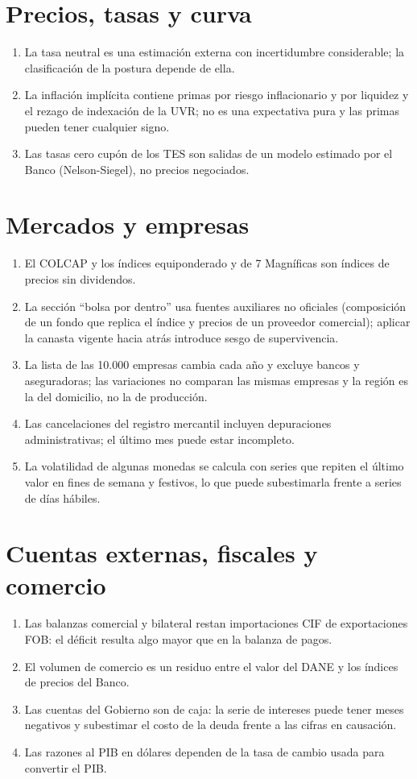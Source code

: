 \section{Precios, tasas y curva}
\begin{enumerate}
\item La tasa neutral es una estimación externa con incertidumbre considerable; la clasificación de la postura depende
  de ella.
\item La inflación implícita contiene primas por riesgo inflacionario y por liquidez y el rezago de indexación de la
  UVR; no es una expectativa pura y las primas pueden tener cualquier signo.
\item Las tasas cero cupón de los TES son salidas de un modelo estimado por el Banco (Nelson-Siegel), no precios
  negociados.
\end{enumerate}

\section{Mercados y empresas}
\begin{enumerate}
\item El COLCAP y los índices equiponderado y de 7 Magníficas son índices de precios sin dividendos.
\item La sección ``bolsa por dentro'' usa fuentes auxiliares no oficiales (composición de un fondo que replica el
  índice y precios de un proveedor comercial); aplicar la canasta vigente hacia atrás introduce sesgo de supervivencia.
\item La lista de las 10.000 empresas cambia cada año y excluye bancos y aseguradoras; las variaciones no comparan las
  mismas empresas y la región es la del domicilio, no la de producción.
\item Las cancelaciones del registro mercantil incluyen depuraciones administrativas; el último mes puede estar
  incompleto.
\item La volatilidad de algunas monedas se calcula con series que repiten el último valor en fines de semana y
  festivos, lo que puede subestimarla frente a series de días hábiles.
\end{enumerate}

\section{Cuentas externas, fiscales y comercio}
\begin{enumerate}
\item Las balanzas comercial y bilateral restan importaciones CIF de exportaciones FOB: el déficit resulta algo mayor
  que en la balanza de pagos.
\item El volumen de comercio es un residuo entre el valor del DANE y los índices de precios del Banco.
\item Las cuentas del Gobierno son de caja: la serie de intereses puede tener meses negativos y subestimar el costo de
  la deuda frente a las cifras en causación.
\item Las razones al PIB en dólares dependen de la tasa de cambio usada para convertir el PIB.
\end{enumerate}

